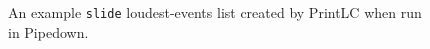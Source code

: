 \begin{figure}[p]
\label{fig:example-loudest_slide_events}
\center
{}
\caption{An example \texttt{slide} loudest-events list created by PrintLC when run in Pipedown.}
\end{figure}

